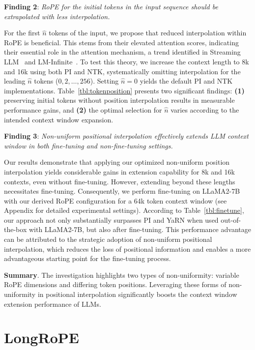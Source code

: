 \textbf{Finding 2}: \textit{RoPE for the initial tokens in the input sequence should be extrapolated with less interpolation.} 

For the first $\hat{n}$ tokens of the input, we propose that reduced interpolation within RoPE is beneficial. This stems from their elevated attention scores, indicating their essential role in the attention mechanism, a trend identified in Streaming LLM~\cite{streamingllm} and LM-Infinite~\cite{han2023lminfinite}. To test this theory, we increase the context length to 8k and 16k using both PI and NTK, systematically omitting interpolation for the leading $\hat n$ tokens ($0, 2, \ldots, 256$). Setting $\hat n = 0$ yields the default PI and NTK implementations. Table~\ref{tbl:tokenposition} presents two significant findings: \textbf{(1)} preserving initial tokens without position interpolation results in measurable performance gains, and \textbf{(2)} the optimal selection for $\hat n$ varies according to the intended context window expansion.

\textbf{Finding 3}: \textit{Non-uniform positional interpolation effectively extends LLM context window in both fine-tuning and non-fine-tuning settings.} 

Our results demonstrate that applying our optimized non-uniform position interpolation yields considerable gains in extension capability for 8k and 16k contexts, even without fine-tuning. However, extending beyond these lengths necessitates fine-tuning. Consequently, we perform fine-tuning on LLaMA2-7B with our derived RoPE configuration for a 64k token context window (see Appendix for detailed experimental settings). According to Table~\ref{tbl:finetune}, our approach not only substantially surpasses PI and YaRN when used out-of-the-box with LLaMA2-7B, but also after fine-tuning. This performance advantage can be attributed to the strategic adoption of non-uniform positional interpolation, which reduces the loss of positional information and enables a more advantageous starting point for the fine-tuning process.

\textbf{Summary}. The investigation highlights two types of non-uniformity: variable RoPE dimensions and differing token positions. Leveraging these forms of non-uniformity in positional interpolation significantly boosts the context window extension performance of LLMs.

\section{LongRoPE}


